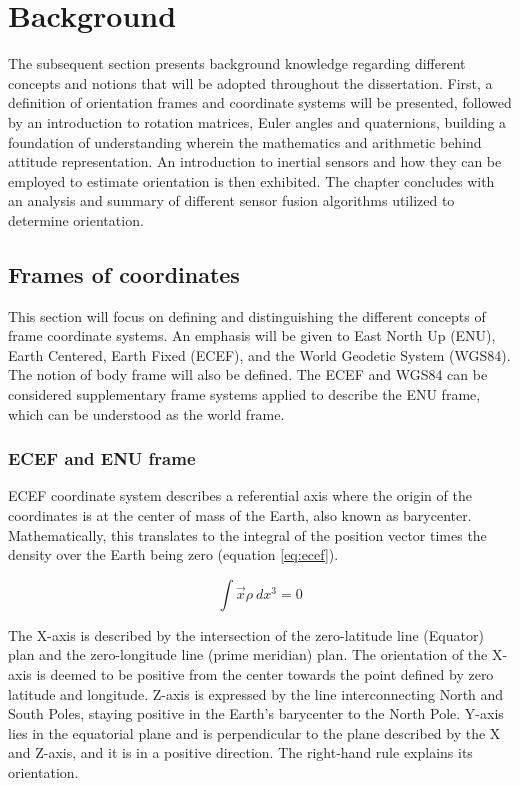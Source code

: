 \section{Background}

The subsequent section presents background knowledge regarding different concepts and notions that will be adopted throughout the dissertation.
First, a definition of orientation frames and coordinate systems will be presented, followed by an introduction to rotation matrices, Euler angles and quaternions, building a foundation of understanding wherein the mathematics and arithmetic behind attitude representation. An introduction to inertial sensors and how they can be employed to estimate orientation is then exhibited. The chapter concludes with an analysis and summary of different sensor fusion algorithms utilized to determine orientation.

\subsection{Frames of coordinates}

This section will focus on defining and distinguishing the different concepts of frame coordinate systems. An emphasis will be given to East North Up (ENU), Earth Centered, Earth Fixed (ECEF), and the World Geodetic System (WGS84). The notion of body frame will also be defined. The ECEF and WGS84 can be considered supplementary frame systems applied to describe the ENU frame, which can be understood as the world frame.

\subsubsection{ECEF and ENU frame}

ECEF coordinate system describes a referential axis where the origin of the coordinates is at the center of mass of the Earth, also known as barycenter. Mathematically, this translates to the integral of the position vector times the density over the Earth being zero (equation \ref{eq:ecef}).

\begin{equation}
    \int \overrightarrow{x}\rho~dx^3 = 0
    \label{eq:ecef}
\end{equation}

The X-axis is described by the intersection of the zero-latitude line (Equator) plan and the zero-longitude line (prime meridian) plan. The orientation of the X-axis is deemed to be positive from the center towards the point defined by zero latitude and longitude. Z-axis is expressed by the line interconnecting North and South Poles, staying positive in the Earth's barycenter to the North Pole. Y-axis lies in the equatorial plane and is perpendicular to the plane described by the X and Z-axis, and it is in a positive direction.  The right-hand rule explains its orientation.

